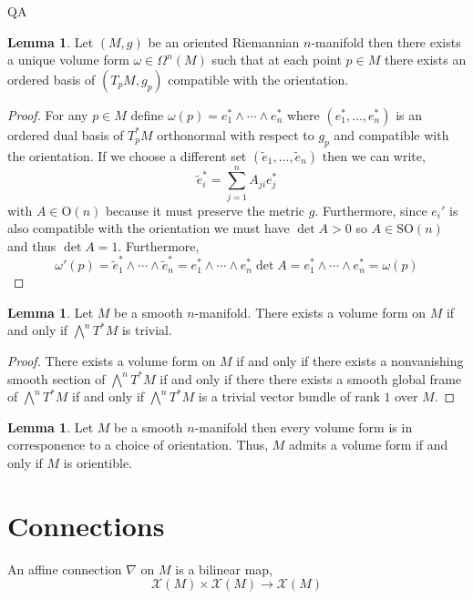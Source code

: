 QA	 \documentclass[12pt]{extarticle}
\theoremstyle{definition}
\newtheorem{lemma}[theorem]{Lemma}
\newenvironment{definition}[1][Definition:]{\begin{trivlist}
\item[\hskip \labelsep {\bfseries #1}]}{\end{trivlist}}
\newcommand{\Orth}[1]{\mathrm{O}\left(#1\right)}
\newcommand{\SO}[1]{\mathrm{SO}\left(#1\right)}
\begin{document}
\begin{lemma}
Let $(M, g)$ be an oriented Riemannian $n$-manifold then there exists a unique volume form $\omega \in \Omega^n(M)$ such that at each point $p \in M$ there exists an ordered basis of $(T_p M, g_p)$ compatible with the orientation.
\end{lemma}


\begin{proof}
For any $p \in M$ define $\omega(p) = e_1^* \wedge \cdots \wedge e_n^* $ where $(e_1^*, \dots, e_n^*)$ is an ordered dual basis of $T_p^*M$ orthonormal with respect to $g_p$ and compatible with the orientation. If we choose a different set $(\tilde{e}_1, \dots, \tilde{e}_n)$ then we can write,
\[ \tilde{e}_i^* = \sum_{j = 1}^n A_{ji} e_j^* \]
with $A \in \Orth{n}$ because it must preserve the metric $g$. Furthermore, since $e_i'$ is also compatible with the orientation we must have $\det{A} > 0$ so $A \in \SO{n}$ and thus $\det{A} = 1$. Furthermore,
\[ \omega'(p) = \tilde{e}_1^* \wedge \cdots \wedge \tilde{e}_n^* = e_1^* \wedge \cdots \wedge e_n^* \det{A} = e_1^* \wedge \cdots \wedge e_n^* = \omega(p) \]
\end{proof}

\begin{lemma}
Let $M$ be a smooth $n$-manifold. There exists a volume form on $M$ if and only if $\bigwedge^n T^* M$ is trivial.
\end{lemma}

\begin{proof}
There exists a volume form on $M$ if and only if there exists a nonvanishing smooth section of $\bigwedge^n T^* M$ if and only if there there exists a smooth global frame of $\bigwedge^n T^* M$ if and only if $\bigwedge^n T^* M$ is a trivial vector bundle of rank $1$ over $M$. 
\end{proof}

\begin{lemma}
Let $M$ be a smooth $n$-manifold then every volume form is in corresponence to a choice of orientation. Thus, $M$ admits a volume form if and only if $M$ is orientible. 
\end{lemma}

\section{Connections}

\begin{definition}
An affine connection $\nabla$ on $M$ is a bilinear map,
\[ \mathscr{X}(M) \times \mathscr{X}(M) \to \mathscr{X}(M) \]
\end{definition}
\end{document}
